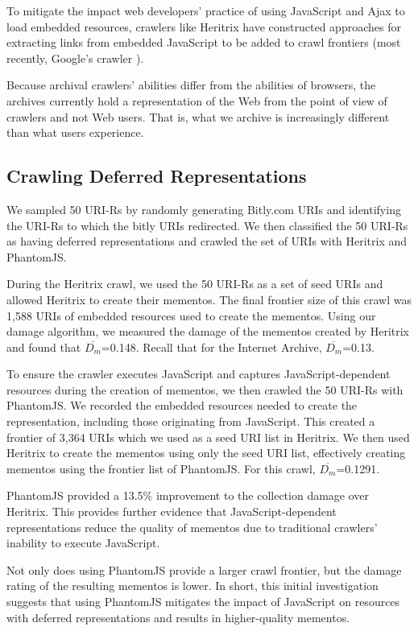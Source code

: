 To mitigate the impact web developers' practice of using JavaScript and Ajax to load embedded resources, crawlers like Heritrix have constructed approaches for extracting links from embedded JavaScript to be added to crawl frontiers  \cite{htrixJS} (most recently, Google's crawler \cite{googleJS}).

Because archival crawlers' abilities differ from the abilities of browsers, the archives currently hold a representation of the Web from the point of view of crawlers and not Web users. That is, what we archive is increasingly different than what users experience.

\subsection{Crawling Deferred Representations}
\label{crawlDeferred}
We sampled 50 URI-Rs by randomly generating Bitly.com URIs and identifying the URI-Rs to which the bitly URIs redirected. We then classified the 50 URI-Rs as having deferred representations and crawled the set of URIs with Heritrix and PhantomJS. 

During the Heritrix crawl, we used the 50 URI-Rs as a set of seed URIs and allowed Heritrix to create their mementos. The final frontier size of this crawl was 1,588 URIs of embedded resources used to create the mementos. Using our damage algorithm, we measured the damage of the mementos created by Heritrix and found that $\overline{D_m}$=0.148. Recall that for the Internet Archive, $\overline{D_m}$=0.13.

To ensure the crawler executes JavaScript and captures JavaScript-dependent resources during the creation of mementos, we then crawled the 50 URI-Rs with PhantomJS. We recorded the embedded resources needed to create the representation, including those originating from JavaScript. This created a frontier of 3,364 URIs which we used as a seed URI list in Heritrix. We then used Heritrix to create the mementos using only the seed URI list, effectively creating mementos using the frontier list of PhantomJS. For this crawl, $\overline{D_m}$=0.1291. 

PhantomJS provided a 13.5\% improvement to the collection damage over Heritrix. This provides further evidence that JavaScript-dependent representations reduce the quality of mementos due to traditional crawlers' inability to execute JavaScript.

Not only does using PhantomJS provide a larger crawl frontier, but the damage rating of the resulting mementos is lower. In short, this initial investigation suggests that using PhantomJS mitigates the impact of JavaScript on resources with deferred representations and results in higher-quality mementos.

